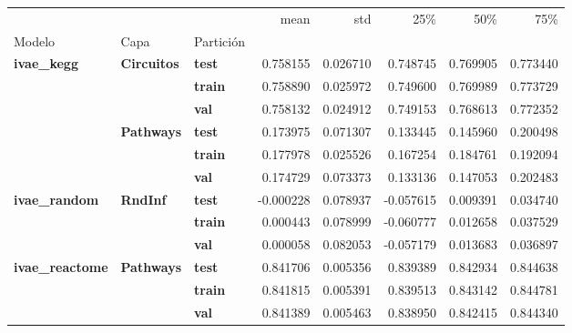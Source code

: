 \begin{tabular}{lllrrrrr}
\toprule
 &  &  & mean & std & 25\% & 50\% & 75\% \\
Modelo & Capa & Partición &  &  &  &  &  \\
\midrule
\multirow[t]{6}{*}{\textbf{ivae\_kegg}} & \multirow[t]{3}{*}{\textbf{Circuitos}} & \textbf{test} & 0.758155 & 0.026710 & 0.748745 & 0.769905 & 0.773440 \\
\textbf{} & \textbf{} & \textbf{train} & 0.758890 & 0.025972 & 0.749600 & 0.769989 & 0.773729 \\
\textbf{} & \textbf{} & \textbf{val} & 0.758132 & 0.024912 & 0.749153 & 0.768613 & 0.772352 \\
\cline{2-8}
\textbf{} & \multirow[t]{3}{*}{\textbf{Pathways}} & \textbf{test} & 0.173975 & 0.071307 & 0.133445 & 0.145960 & 0.200498 \\
\textbf{} & \textbf{} & \textbf{train} & 0.177978 & 0.025526 & 0.167254 & 0.184761 & 0.192094 \\
\textbf{} & \textbf{} & \textbf{val} & 0.174729 & 0.073373 & 0.133136 & 0.147053 & 0.202483 \\
\cline{1-8} \cline{2-8}
\multirow[t]{3}{*}{\textbf{ivae\_random}} & \multirow[t]{3}{*}{\textbf{RndInf}} & \textbf{test} & -0.000228 & 0.078937 & -0.057615 & 0.009391 & 0.034740 \\
\textbf{} & \textbf{} & \textbf{train} & 0.000443 & 0.078999 & -0.060777 & 0.012658 & 0.037529 \\
\textbf{} & \textbf{} & \textbf{val} & 0.000058 & 0.082053 & -0.057179 & 0.013683 & 0.036897 \\
\cline{1-8} \cline{2-8}
\multirow[t]{3}{*}{\textbf{ivae\_reactome}} & \multirow[t]{3}{*}{\textbf{Pathways}} & \textbf{test} & 0.841706 & 0.005356 & 0.839389 & 0.842934 & 0.844638 \\
\textbf{} & \textbf{} & \textbf{train} & 0.841815 & 0.005391 & 0.839513 & 0.843142 & 0.844781 \\
\textbf{} & \textbf{} & \textbf{val} & 0.841389 & 0.005463 & 0.838950 & 0.842415 & 0.844340 \\
\cline{1-8} \cline{2-8}
\bottomrule
\end{tabular}
